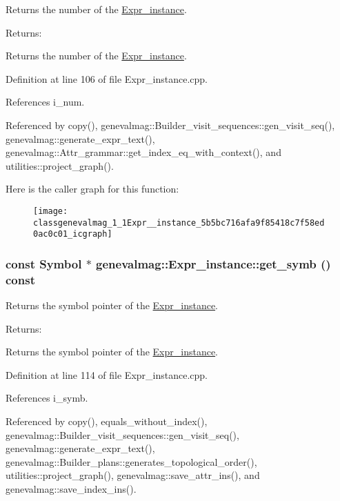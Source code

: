 Returns the number of the \hyperlink{classgenevalmag_1_1Expr__instance}{Expr\_\-instance}. \begin{Desc}
\item[Returns:]\end{Desc}
Returns the number of the \hyperlink{classgenevalmag_1_1Expr__instance}{Expr\_\-instance}. 

Definition at line 106 of file Expr\_\-instance.cpp.

References i\_\-num.

Referenced by copy(), genevalmag::Builder\_\-visit\_\-sequences::gen\_\-visit\_\-seq(), genevalmag::generate\_\-expr\_\-text(), genevalmag::Attr\_\-grammar::get\_\-index\_\-eq\_\-with\_\-context(), and utilities::project\_\-graph().

Here is the caller graph for this function:\nopagebreak
\begin{figure}[H]
\begin{center}
\leavevmode
\texttt{[image: classgenevalmag\_1\_1Expr\_\_instance\_5b5bc716afa9f85418c7f58ed0ac0c01\_icgraph]}
\end{center}
\end{figure}
\hypertarget{classgenevalmag_1_1Expr__instance_5327a138bd6dc934ce89d878d973bfb0}{
\subsubsection[{get\_\-symb}]{\setlength{\rightskip}{0pt plus 5cm}const {\bf Symbol} $\ast$ genevalmag::Expr\_\-instance::get\_\-symb () const}}
\label{classgenevalmag_1_1Expr__instance_5327a138bd6dc934ce89d878d973bfb0}


Returns the symbol pointer of the \hyperlink{classgenevalmag_1_1Expr__instance}{Expr\_\-instance}. \begin{Desc}
\item[Returns:]\end{Desc}
Returns the symbol pointer of the \hyperlink{classgenevalmag_1_1Expr__instance}{Expr\_\-instance}. 

Definition at line 114 of file Expr\_\-instance.cpp.

References i\_\-symb.

Referenced by copy(), equals\_\-without\_\-index(), genevalmag::Builder\_\-visit\_\-sequences::gen\_\-visit\_\-seq(), genevalmag::generate\_\-expr\_\-text(), genevalmag::Builder\_\-plans::generates\_\-topological\_\-order(), utilities::project\_\-graph(), genevalmag::save\_\-attr\_\-ins(), and genevalmag::save\_\-index\_\-ins().

